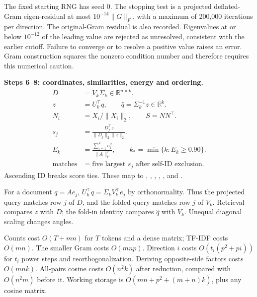 \documentclass[11pt]{article}
\newcommand{\R}{\mathbb{R}}
\begin{document}
The fixed starting RNG has seed 0. The stopping test is a projected
deflated-Gram eigen-residual at most $10^{-14}\|G\|_F$, with a maximum
of 200,000 iterations per direction. The original-Gram residual is
also recorded. Eigenvalues at or below $10^{-12}$ of the leading
value are rejected as unresolved, consistent with the earlier cutoff.
Failure to converge or to resolve a positive value raises an error.
Gram construction squares the nonzero condition number and therefore
requires this numerical caution.

\textbf{Steps 6--8: coordinates, similarities, energy and ordering.}
\begin{align}
D&=V_k\Sigma_k\in\R^{n\times k}. \tag{E9}\\
z&=U_k^\top q,\qquad \widehat q=\Sigma_k^{-1}z\in\R^k. \tag{E10}\\
N_i&=X_i/\|X_i\|_2,\qquad S=NN^\top. \tag{E11}\\
s_j&=\frac{D_j^\top z}{\|D_j\|_2\|z\|_2}. \tag{E12}\\
E_k&=\frac{\sum_{i=1}^k\sigma_i^2}{\|A\|_F^2},\qquad
k_*=\min\{k:E_k\ge0.90\}. \tag{E13}\\
\mathrm{matches}&=\text{five largest }s_j\text{ after self-ID exclusion}. \tag{E14}
\end{align}
Ascending ID breaks score ties. These map to
, ,
, ,
,  and
.

For a document $q=Ae_j$, $U_k^\top q=\Sigma_kV_k^\top e_j$
by orthonormality. Thus the projected query matches row $j$ of $D$,
and the folded query matches row $j$ of $V_k$.
Retrieval compares $z$ with $D$; the fold-in identity compares
$\widehat q$ with $V_k$. Unequal diagonal scaling changes angles.

Counts cost $O(T+mn)$ for $T$ tokens and a dense matrix; TF-IDF costs
$O(mn)$. The smaller Gram costs $O(mnp)$. Direction $i$ costs
$O(t_i(p^2+pi))$ for $t_i$ power steps and reorthogonalization.
Deriving opposite-side factors costs $O(mnk)$. All-pairs cosine costs
$O(n^2k)$ after reduction, compared with $O(n^2m)$ before it.
Working storage is $O(mn+p^2+(m+n)k)$, plus any cosine matrix.
\end{document}

